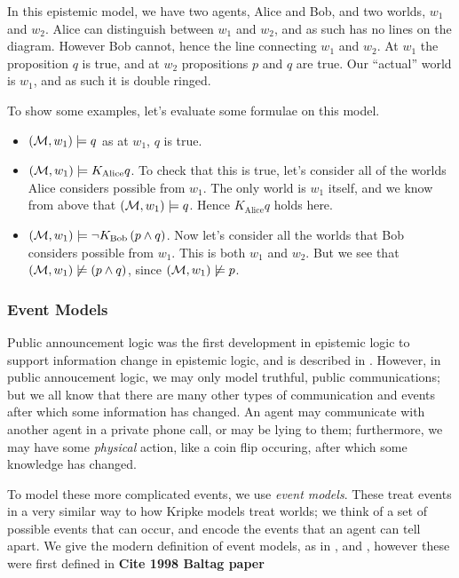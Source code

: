 \documentclass[12pt, a4paper]{article}
\begin{document}
In this epistemic model, we have two agents, Alice and Bob, and two worlds,
$w_1$ and $w_2$. Alice can distinguish between $w_1$ and $w_2$, and as such has
no lines on the diagram. However Bob cannot, hence the line connecting $w_1$ and
$w_2$. At $w_1$ the proposition $q$ is true, and at $w_2$ propositions $p$ and
$q$ are true. Our ``actual'' world is $w_1$, and as such it is double ringed. 

To show some examples, let's evaluate some formulae on this model.

\begin{itemize}
\item $(\mathcal{M}, w_1) \models q$ as at $w_1$, $q$ is true.
\item $(\mathcal{M}, w_1) \models K_{\text{Alice}} q$. To check that this is true, let's
  consider all of the worlds Alice considers possible from $w_1$. The only world
  is $w_1$ itself, and we know from above that $(\mathcal{M}, w_1) \models q$. Hence
  $K_{\text{Alice}} q$ holds here.
\item $(\mathcal{M}, w_1) \models \neg K_{\text{Bob}} \left( p \land q \right)$. Now
  let's consider all the worlds that Bob considers possible from $w_1$. This is
  both $w_1$ and $w_2$. But we see that $(\mathcal{M}, w_1) \not \models (p \land
  q)$, since $(\mathcal{M}, w_1) \not \models p$. 
\end{itemize}

\subsubsection{Event Models}
\label{sec:Event Models}

Public announcement logic was the first development in epistemic logic to
support information change in epistemic logic, and is described in \cite{PAL}.
However, in public annoucement logic, we may only model truthful, public
communications; but we all know that there are many other types of communication
and events after which some information has changed. An agent may communicate
with another agent in a private phone call, or may be lying to them;
furthermore, we may have some \textit{physical} action, like a coin flip
occuring, after which some knowledge has changed.

To model these more complicated events, we use \textit{event models}. These
treat events in a very similar way to how Kripke models treat worlds; we think
of a set of possible events that can occur, and encode the events that an agent
can tell apart. We give the modern definition of event models, as in
\cite{MalvinThesis}, and \cite{AutomataTechniques}, however these were first
defined in \textbf{Cite 1998 Baltag paper}
\end{document}
